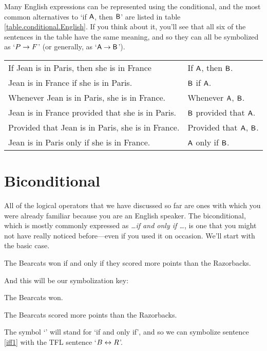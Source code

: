 Many English expressions can be represented using the conditional, and the most common alternatives to `if $\mathsf{A}$, then $\mathsf{B}$' are listed in table \ref{table.conditional.English}. If you think about it, you'll see that all six of the sentences in the table have the same meaning, and so they can all be symbolized as `$P \rightarrow F$' (or generally, as `$\mathsf{A} \rightarrow \mathsf{B}$'). 


\begin{table*}\centering\sffamily\footnotesize
{}
\begin{tabular}{@{}l l@{}}\toprule
If Jean is in Paris, then she is in France & If $\mathsf{A}$, then $\mathsf{B}$.\\
Jean is in France if she is in Paris. 	&	$\mathsf{B}$ if $\mathsf{A}$.\\
Whenever Jean is in Paris, she is in France.  	&	Whenever $\mathsf{A}$, $\mathsf{B}$.\\
Jean is in France provided that she is in Paris. 	&	$\mathsf{B}$ provided that $\mathsf{A}$.\\
Provided that Jean is in Paris, she is in France. 	&	Provided that $\mathsf{A}$, $\mathsf{B}$.\\
Jean is in Paris only if she is in France. 	&	$\mathsf{A}$ only if $\mathsf{B}$.\\
\bottomrule
\end{tabular}
\caption{The most common way of expressing a conditional in English is as `If Jean is in Paris, then she is in France.' This table lists some alternative but equivalent ways of expressing the same sentence.}\label{table.conditional.English}
\end{table*}


\section{Biconditional}\label{s:biconditional-1}

All of the logical operators that we have discussed so far are ones with which you were already familiar because you are an English speaker. The biconditional, which is mostly commonly expressed as \textit{\ldots if and only if \ldots}, is one that you might not have really noticed before---even if you used it on occasion. We'll start with the basic case.
	\begin{earg}
		\item[\ex{iff1}] The Bearcats won if and only if they scored more points than the Razorbacks.
	\end{earg}
And this will be our symbolization key:
	\begin{ekey}
		\item[B] The Bearcats won.
		\item[R] The Bearcats scored more points than the Razorbacks.
	\end{ekey}
The symbol `\eiff' will stand for `if and only if', and so we can symbolize sentence \ref{iff1} with the TFL sentence `$B \leftrightarrow R$'.

